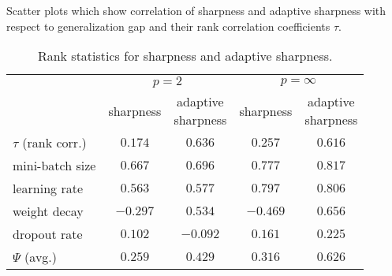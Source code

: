 \documentclass{article}
\newcommand{\mf}[1]{\mathbf{#1}}
\begin{document}
\beginfigure
\centering
\ificml
{}
\else
{}
\fi
\caption{Scatter plots which show correlation of sharpness and adaptive sharpness with respect to generalization gap and their rank correlation coefficients $\tau$.}\label{scatter}
\jmkendfigure

\begin{table}[t]
\ificml
\else
    \centering
    \captionsetup{justification=centering}
\fi
\setlength\tabcolsep{3.5pt}
\caption{Rank statistics for sharpness and adaptive sharpness. \label{rank}}
\begin{center}
\begin{small}
\begin{tabular}{lcccc}
\toprule
\multirow{2}{*}{} & \multicolumn{2}{c}{$p=2$} & \multicolumn{2}{c}{$p=\infty$}\\
\cmidrule{2-5}
& \multirow{1}{*}{sharpness} & \makecell{adaptive\\sharpness} & sharpness & \makecell{adaptive\\sharpness}\\
\midrule
$\tau$ (rank corr.) & $0.174$ & $\mf{0.636}$ & $0.257$ & $\mf{0.616}$\\
mini-batch size & $0.667$ & $\mf{0.696}$ & $0.777$ & $\mf{0.817}$\\
learning rate & $0.563$ & $\mf{0.577}$ & $0.797$ & $\mf{0.806}$\\
weight decay & $-0.297$ & $\mf{0.534}$ & $-0.469$ & $\mf{0.656}$\\
dropout rate & $\mf{0.102}$ & $-0.092$ & $0.161$ & $\mf{0.225}$\\
$\Psi$ (avg.) & $0.259$ & $\mf{0.429}$ & $0.316$ & $\mf{0.626}$\\
\bottomrule
\end{tabular}
\end{small}
\end{center}
\end{table}
\end{document}
